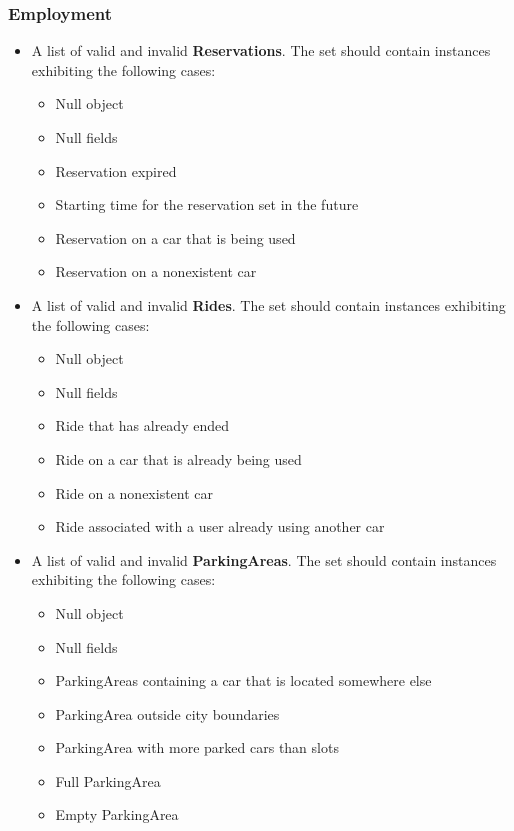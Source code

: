 		
	
		\subsubsection{Employment}
		
		\begin{itemize}
			\item A list of valid and invalid \textbf{Reservations}. The set should contain instances exhibiting the following cases:
				\begin{itemize}
					\item Null object
					\item Null fields
					\item Reservation expired
					\item Starting time for the reservation set in the future
					\item Reservation on a car that is being used
					\item Reservation on a nonexistent car
				\end{itemize}
		\end{itemize}
		
		\begin{itemize}
			\item A list of valid and invalid \textbf{Rides}. The set should contain instances exhibiting the following cases:
				\begin{itemize}
					\item Null object
					\item Null fields
					\item Ride that has already ended
					\item Ride on a car that is already being used
					\item Ride on a nonexistent car
					\item Ride associated with a user already using another car
				\end{itemize}
		\end{itemize}
		
		\begin{itemize}
			\item A list of valid and invalid \textbf{ParkingAreas}. The set should contain instances exhibiting the following cases:
				\begin{itemize}
					\item Null object
					\item Null fields
					\item ParkingAreas containing a car that is located somewhere else
					\item ParkingArea outside city boundaries
					\item ParkingArea with more parked cars than slots
					\item Full ParkingArea
					\item Empty ParkingArea
				\end{itemize}
		\end{itemize}
		
